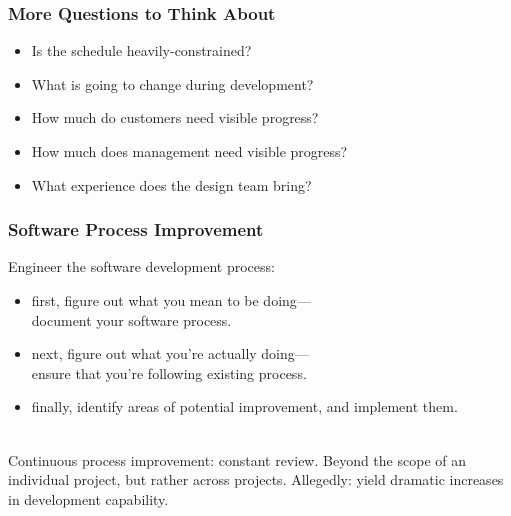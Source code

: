 \begin{frame}
\frametitle{More Questions to Think About}

\large
\begin{changemargin}{0.5cm}
\begin{itemize}
\item Is the schedule heavily-constrained?\\[0.5em]
\item What is going to change during development?\\[0.5em]
\item How much do customers need visible progress?\\[0.5em]
\item How much does management need visible progress?\\[0.5em]
\item What experience does the design team bring?
\end{itemize}
\end{changemargin}
\end{frame}

\begin{frame}
\frametitle{Software Process Improvement}

\begin{changemargin}{1cm}
Engineer the software development process:
\begin{itemize}
\item first, figure out what you mean to be doing---\\
document your software process.
\item next, figure out what you're actually doing---\\
ensure that you're following existing process.
\item finally, identify areas of potential improvement, and implement them.
\end{itemize}
~\\

Continuous process improvement: constant review.
Beyond the scope of an individual project, but rather across projects.
Allegedly: yield dramatic increases in development capability.
\end{changemargin}

\end{frame}



